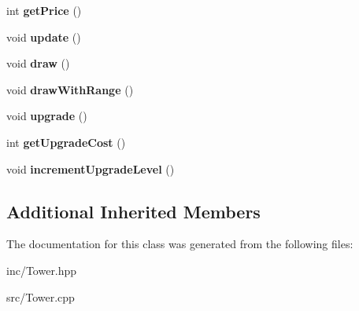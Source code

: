 \begin{DoxyCompactItemize}
\item 
\hypertarget{class_tower_a3b495235e7ca4a76c858d62ba1775aac}{int {\bfseries get\+Price} ()}\label{class_tower_a3b495235e7ca4a76c858d62ba1775aac}

\item 
\hypertarget{class_tower_a127550c2fb83a1b51b10f13bbba18707}{void {\bfseries update} ()}\label{class_tower_a127550c2fb83a1b51b10f13bbba18707}

\item 
\hypertarget{class_tower_ad5b9f1e12c00a79e72853497599b145e}{void {\bfseries draw} ()}\label{class_tower_ad5b9f1e12c00a79e72853497599b145e}

\item 
\hypertarget{class_tower_a0da16ed114045579ca17bdd514388719}{void {\bfseries draw\+With\+Range} ()}\label{class_tower_a0da16ed114045579ca17bdd514388719}

\item 
\hypertarget{class_tower_ac732f3dd9c995a84da0ada08b8346f8f}{void {\bfseries upgrade} ()}\label{class_tower_ac732f3dd9c995a84da0ada08b8346f8f}

\item 
\hypertarget{class_tower_a125030c0253cec6226f3faffa2cd2b53}{int {\bfseries get\+Upgrade\+Cost} ()}\label{class_tower_a125030c0253cec6226f3faffa2cd2b53}

\item 
\hypertarget{class_tower_aa8ca8fa2dc4673acb79d3badeaa4dcbf}{void {\bfseries increment\+Upgrade\+Level} ()}\label{class_tower_aa8ca8fa2dc4673acb79d3badeaa4dcbf}

\end{DoxyCompactItemize}
\subsection*{Additional Inherited Members}


The documentation for this class was generated from the following files\+:\begin{DoxyCompactItemize}
\item 
inc/Tower.\+hpp\item 
src/Tower.\+cpp\end{DoxyCompactItemize}
